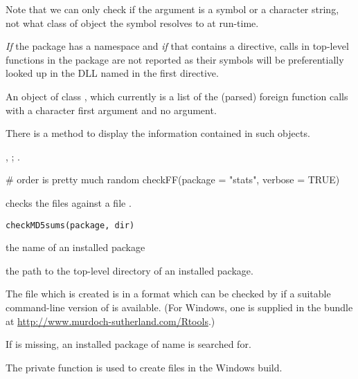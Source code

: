 %
\begin{Details}\relax
Note that we can only check if the  argument is a symbol or
a character string, not what class of object the symbol resolves to
at run-time.

\emph{If} the package has a namespace and \emph{if} that contains a
 directive, calls in top-level functions in the
package are not reported as their symbols will be preferentially
looked up in the DLL named in the first  directive.
\end{Details}
%
\begin{Value}
An object of class , which currently is a list of the
(parsed) foreign function calls with a character first argument and
no  argument.

There is a  method to display the information contained in
such objects.
\end{Value}
%
\begin{SeeAlso}\relax
{},
;
.
\end{SeeAlso}
%
\begin{Examples}
\begin{ExampleCode}
 # order is pretty much random
checkFF(package = "stats", verbose = TRUE)
\end{ExampleCode}
\end{Examples}
%
\begin{Description}\relax
{} checks the files against a file .
\end{Description}
%
\begin{Usage}
\begin{verbatim}
checkMD5sums(package, dir)
\end{verbatim}
\end{Usage}
%
\begin{Arguments}
\begin{ldescription}
\item[\code{package}] the name of an installed package
\item[\code{dir}] the path to the top-level directory of an installed
package.
\end{ldescription}
\end{Arguments}
%
\begin{Details}\relax
The file  which is created is in a format which can be
checked by  if a suitable command-line version
of  is available.  (For Windows, one is supplied in
the bundle at \url{http://www.murdoch-sutherland.com/Rtools}.)

If  is missing, an installed package of name 
is searched for.

The private function  is used to create
 files in the Windows build.
\end{Details}
